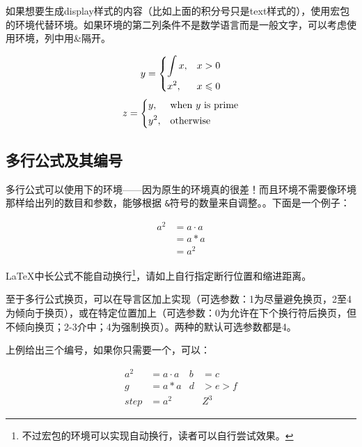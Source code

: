 如果想要生成display样式的内容（比如上面的积分号只是text样式的），使用宏包的环境代替环境。如果环境的第二列条件不是数学语言而是一般文字，可以考虑使用环境，列中用\&{}隔开。

\begin{codeshow}
\[y=\begin{dcases}
  \int x, & x>0 \\
  x^2, & x\leqslant 0
  \end{dcases}\]
\[z=\begin{dcases*}
  y, & when $y$ is prime\\
  y^2, & otherwise
  \end{dcases*}\]
\end{codeshow}

\subsection{多行公式及其编号}
\label{subsec:multieqnum}
多行公式可以使用下的环境——因为原生的环境真的很差！而且环境不需要像环境那样给出列的数目和参数，能够根据
\texttt{\&}符号的数量来自调整。。下面是一个例子：

\begin{codeshow}
\begin{align}
  a^2  &= a\cdot a \\
       &= a*a      \\
       &= a^2
\end{align}
\end{codeshow}

\LaTeX 中长公式不能自动换行\footnote{不过宏包的环境可以实现自动换行，读者可以自行尝试效果。}，请如上自行指定断行位置和缩进距离。

至于多行公式换页，可以在导言区加上实现（可选参数：1为尽量避免换页，2至4为倾向于换页），或在特定位置加上（可选参数：0为允许在下个换行符后换页，但不倾向换页；2-3介中；4为强制换页）。两种的默认可选参数都是4。

上例给出三个编号，如果你只需要一个，可以：

\begin{codeshow}
\begin{align}
  a^2&= a\cdot a& b&=c\nonumber\\
  g  &= a*a & d&>e>f  \nonumber\\
  step&= a^2 & &Z^3
\end{align}
\end{codeshow}

